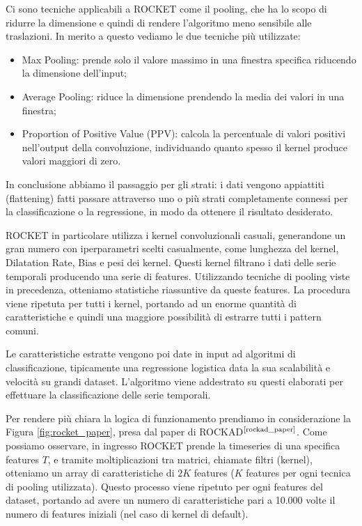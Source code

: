 Ci sono tecniche applicabili a ROCKET come il pooling, che ha lo scopo di ridurre la dimensione e quindi di rendere l'algoritmo meno sensibile alle traslazioni. In merito a questo vediamo le due tecniche più utilizzate:
\begin{itemize}
    \item Max Pooling: prende solo il valore massimo in una finestra specifica riducendo la dimensione dell'input;
    \item Average Pooling: riduce la dimensione prendendo la media dei valori in una finestra;
    \item Proportion of Positive Value (PPV): calcola la percentuale di valori positivi nell'output della convoluzione, individuando quanto spesso il kernel produce valori maggiori di zero.
\end{itemize}

In conclusione abbiamo il passaggio per gli strati: i dati vengono appiattiti (flattening) fatti passare attraverso uno o più strati completamente connessi per la classificazione o la regressione, in modo da ottenere il risultato desiderato.

ROCKET in particolare utilizza i kernel convoluzionali casuali, generandone un gran numero con iperparametri scelti casualmente, come lunghezza del kernel, Dilatation Rate, Bias e pesi dei kernel.
Questi kernel filtrano i dati delle serie temporali producendo una serie di features. Utilizzando tecniche di pooling viste in precedenza, otteniamo statistiche riassuntive da queste features.
La procedura viene ripetuta per tutti i kernel, portando ad un enorme quantità di caratteristiche e quindi una maggiore possibilità di estrarre tutti i pattern comuni.

Le caratteristiche estratte vengono poi date in input ad algoritmi di classificazione, tipicamente una regressione logistica data la sua scalabilità e velocità su grandi dataset.
L'algoritmo viene addestrato su questi elaborati per effettuare la classificazione delle serie temporali.

Per rendere più chiara la logica di funzionamento prendiamo in considerazione la Figura \ref{fig:rocket_paper}, presa dal paper di ROCKAD$^{\text{\cite{rockad_paper}}}$.
Come possiamo osservare, in ingresso ROCKET prende la timeseries di una specifica features $T$, e tramite moltiplicazioni tra matrici, chiamate filtri (kernel), otteniamo un array di caratteristiche di $2K$ features ($K$ features per ogni tecnica di pooling utilizzata).
Questo processo viene ripetuto per ogni features del dataset, portando ad avere un numero di caratteristiche pari a 10.000 volte il numero di features iniziali (nel caso di kernel di default).


